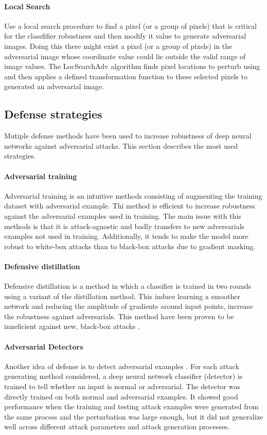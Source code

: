 \documentclass[12pt]{article}
\begin{document}
\paragraph{Local Search}
Use a local search procedure to find a pixel (or a group of pixels) that is critical for the classfifier robustness and then modify it value to generate adversarial images. Doing this there might exist a pixel (or a group of pixels) in the adversarial image whose coordinate value could lie outside the valid range of image values. The LocSearchAdv algorithm finds pixel locations to perturb using and then applies a defined transformation function to these selected pixels to generated an adversarial image.


\subsection{Defense strategies}
Mutiple defense methods have been used to increase robustness of deep neural networks against adversarial attacks. This section describes the most used strategies.

\paragraph{Adversarial training}
Adversarial training is an intuitive methods consisting of augmenting the training dataset with adversarial example. Thi method is efficient to increase robustness against the adversarial examples used in training. The main issue with this methods is that it is attack-agnostic and badly transfers to new adversarials examples not used in training. Additionally, it tends to make the model more robust to white-box attacks than to black-box attacks due to gradient masking.

\paragraph{Defensive distillation}
Defensive distillation \cite{papernot_distillation_2015} is a method in which a classifier is trained in two rounds using a variant of the distillation \cite{hinton_distilling_2015} method. This induce learning a smoother network and reducing the amplitude of gradients around input points, increase the robustness against adversarials. This method have been proven to be inneficient against new, black-box attacks \cite{carlini_defensive_2016}.

\paragraph{Adversarial Detectors}
Another idea of defense is to detect adversarial examples \cite{metzen_detecting_2017}. For each attack generating method considered, a deep neural network classifier (detector) is trained to tell whether an input is normal or adversarial. The detector was directly trained on both normal and adversarial examples. It showed good performance when the training and testing attack examples were generated from the same process and the perturbation was large enough, but it did not generalize well across different attack parameters and attack generation processes.
\end{document}
